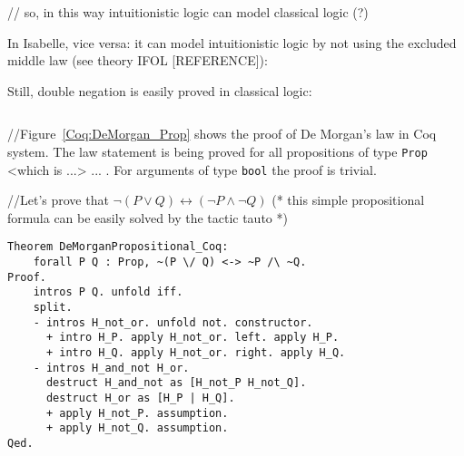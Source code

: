 \documentclass[article]{aaltoseries}
\begin{document}
// so, in this way intuitionistic logic can model classical logic (?)

In Isabelle, vice versa: it can model intuitionistic logic by not using the excluded middle law (see theory IFOL [REFERENCE]):  %

Still, double negation is easily proved in classical logic:
\begin{lstlisting}[language=isabelle]
\end{lstlisting}


//Figure~\ref{Coq:DeMorgan_Prop} shows the proof of De Morgan's law in Coq system. The law statement is being proved for all propositions of type \texttt{Prop}  <which is ...> ... . For arguments of type \texttt{bool} the proof is trivial.

//Let's prove that $\neg (P \lor Q) \leftrightarrow (\neg P \land \neg Q)$
    (* this simple propositional formula can be easily solved by the tactic tauto *)
    
\begin{lstlisting}[language=coq,caption={Proof of propositional logic tautology in Coq: the de Morgan's law for propositions},label={DeMorganPropositional_Coq}]
Theorem DeMorganPropositional_Coq:
    forall P Q : Prop, ~(P \/ Q) <-> ~P /\ ~Q.
Proof.
    intros P Q. unfold iff.
    split.
    - intros H_not_or. unfold not. constructor.
      + intro H_P. apply H_not_or. left. apply H_P.
      + intro H_Q. apply H_not_or. right. apply H_Q.
    - intros H_and_not H_or.
      destruct H_and_not as [H_not_P H_not_Q].
      destruct H_or as [H_P | H_Q].
      + apply H_not_P. assumption.
      + apply H_not_Q. assumption.
Qed.
\end{lstlisting}
\end{document}
